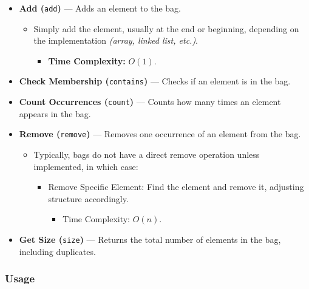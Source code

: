 \documentclass[
  letterpaper,
  DIV=11,
  numbers=noendperiod]{scrreprt}
\providecommand{\tightlist}{%
  \setlength{\itemsep}{0pt}\setlength{\parskip}{0pt}}
\begin{document}
\begin{itemize}
\tightlist
\item
  \textbf{Add (}\texttt{add}\textbf{)} --- Adds an element to the bag.

  \begin{itemize}
  \tightlist
  \item
    Simply add the element, usually at the end or beginning, depending
    on the implementation \emph{(array, linked list, etc.)}.

    \begin{itemize}
    \tightlist
    \item
      \textbf{Time Complexity:} \(O(1)\).
    \end{itemize}
  \end{itemize}
\item
  \textbf{Check Membership (}\texttt{contains}\textbf{)} --- Checks if
  an element is in the bag.
\item
  \textbf{Count Occurrences (}\texttt{count}\textbf{)} --- Counts how
  many times an element appears in the bag.
\item
  \textbf{Remove (}\texttt{remove}\textbf{)} --- Removes one occurrence
  of an element from the bag.

  \begin{itemize}
  \tightlist
  \item
    Typically, bags do not have a direct remove operation unless
    implemented, in which case:

    \begin{itemize}
    \tightlist
    \item
      Remove Specific Element: Find the element and remove it, adjusting
      structure accordingly.

      \begin{itemize}
      \tightlist
      \item
        Time Complexity: \(O(n)\).
      \end{itemize}
    \end{itemize}
  \end{itemize}
\item
  \textbf{Get Size (}\texttt{size}\textbf{)} --- Returns the total
  number of elements in the bag, including duplicates.
\end{itemize}

\subsubsection{Usage}
\end{document}
